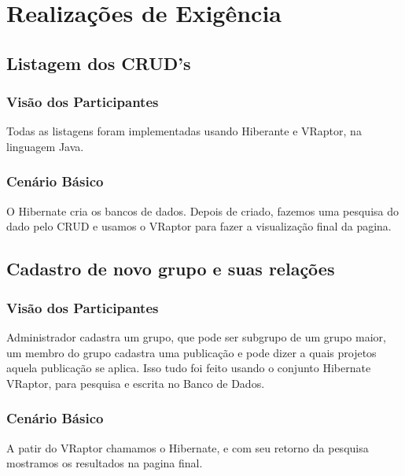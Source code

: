 \documentclass[11pt, a4paper]{article}
\begin{document}
		
	\section{Realizações de Exigência}
        
        \subsection{Listagem dos CRUD's}
		
	        \subsubsection{Visão dos Participantes}
                Todas as listagens foram implementadas usando Hiberante e VRaptor, na linguagem Java.
		
	        \subsubsection{Cenário Básico}
                O Hibernate cria os bancos de dados. Depois de criado, fazemos uma pesquisa do dado pelo CRUD e usamos o VRaptor para fazer a visualização final da pagina.
					
             
        \subsection{Cadastro de novo grupo e suas relações}
		
	        \subsubsection{Visão dos Participantes}
                Administrador cadastra um grupo, que pode ser subgrupo de um grupo maior, um membro do grupo cadastra uma publicação e pode dizer a quais projetos aquela publicação se aplica. Isso tudo foi feito usando o conjunto Hibernate VRaptor, para pesquisa e escrita no Banco de Dados.

	        \subsubsection{Cenário Básico}
                A patir do VRaptor chamamos o Hibernate, e com seu retorno da pesquisa mostramos os resultados na pagina final.
\end{document}
